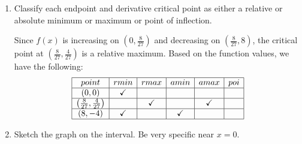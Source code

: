 \documentclass[letterpaper,12pt,fleqn]{article}
\newcommand{\cm}{\checkmark}
\begin{document}
\begin{enumerate}[left=0in]
\item Classify each endpoint and derivative critical point as either a relative or absolute minimum or maximum or
  point of inflection.

  Since \(f(x)\) is increasing on \((0,\frac{8}{27})\) and decreasing on \((\frac{8}{27},8)\), the critical point
  at \((\frac{8}{27},\frac{4}{27})\) is a relative maximum.  Based on the function values, we have the following:
  \[\begin{array}{|c|c|c|c|c|c|}
  \hline
  point & rmin & rmax & amin & amax & poi \\
  \hline
  (0,0) & \cm & & & & \\
  \hline
  \left(\frac{8}{27},\frac{4}{27}\right) & & \cm & & \cm & \\
  \hline
  (8,-4) & \cm & & \cm & & \\
  \hline
  \end{array}\]

\item Sketch the graph on the interval.  Be very specific near \(x=0\).

  \begin{center}
  \end{center}

\end{enumerate}
\end{document}
